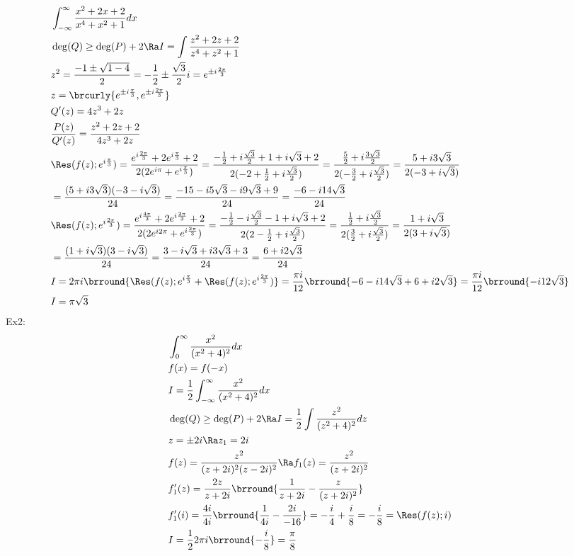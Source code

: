 \begin{align*}
    &\int_{-\infty}^\infty\frac{x^2+2x+2}{x^4+x^2+1}dx\\
    &\deg(Q)\geq\deg(P)+2\Ra I=\int\frac{z^2+2z+2}{z^4+z^2+1}\\
    &z^2=\frac{-1\pm\sqrt{1-4}}{2}=-\frac{1}{2}\pm\frac{\sqrt{3}}{2}i=e^{\pm i\frac{2\pi}{3}}\\
    &z=\brcurly{e^{\pm i\frac{\pi}{3}},e^{\pm i\frac{2\pi}{3}}}\\
    &Q'(z)=4z^3+2z\\
    &\frac{P(z)}{Q'(z)}=\frac{z^2+2z+2}{4z^3+2z}\\
    &\Res(f(z);e^{i\frac{\pi}{3}})=\frac{e^{i\frac{2\pi}{3}}+2e^{i\frac{\pi}{3}}+2}{2(2e^{i\pi}+e^{i\frac{\pi}{3}})}=\frac{-\frac{1}{2}+i\frac{\sqrt{3}}{2}+1+i\sqrt{3}+2}{2(-2+\frac{1}{2}+i\frac{\sqrt{3}}{2})}=\frac{\frac{5}{2}+i\frac{3\sqrt{3}}{2}}{2(-\frac{3}{2}+i\frac{\sqrt{3}}{2})}=\frac{5+i3\sqrt{3}}{2(-3+i\sqrt{3})}\\
    &=\frac{(5+i3\sqrt{3})(-3-i\sqrt{3})}{24}=\frac{-15-i5\sqrt{3}-i9\sqrt{3}+9}{24}=\frac{-6-i14\sqrt{3}}{24}\\
    &\Res(f(z);e^{i\frac{2\pi}{3}})=\frac{e^{i\frac{4\pi}{3}}+2e^{i\frac{2\pi}{3}}+2}{2(2e^{i2\pi}+e^{i\frac{2\pi}{3}})}=\frac{-\frac{1}{2}-i\frac{\sqrt{3}}{2}-1+i\sqrt{3}+2}{2(2-\frac{1}{2}+i\frac{\sqrt{3}}{2})}=\frac{\frac{1}{2}+i\frac{\sqrt{3}}{2}}{2(\frac{3}{2}+i\frac{\sqrt{3}}{2})}=\frac{1+i\sqrt{3}}{2(3+i\sqrt{3})}\\
    &=\frac{(1+i\sqrt{3})(3-i\sqrt{3})}{24}=\frac{3-i\sqrt{3}+i3\sqrt{3}+3}{24}=\frac{6+i2\sqrt{3}}{24}\\
    &I=2\pi i\brround{\Res(f(z);e^{i\frac{\pi}{3}}+\Res(f(z);e^{i\frac{2\pi}{3}})}=\frac{\pi i}{12}\brround{-6-i14\sqrt{3}+6+i2\sqrt{3}}=\frac{\pi i}{12}\brround{-i12\sqrt{3}}\\
    &I=\pi\sqrt{3}
\end{align*}
Ex2:
\begin{align*}
    &\int_0^\infty\frac{x^2}{(x^2+4)^2}dx\\
    &f(x)=f(-x)\\
    &I=\frac{1}{2}\int_{-\infty}^\infty\frac{x^2}{(x^2+4)^2}dx\\
    &\deg(Q)\geq\deg(P)+2\Ra I=\frac{1}{2}\int\frac{z^2}{(z^2+4)^2}dz\\
    &z=\pm 2i\Ra z_1=2i\\
    &f(z)=\frac{z^2}{(z+2i)^2(z-2i)^2}\Ra f_1(z)=\frac{z^2}{(z+2i)^2}\\
    &f_1'(z)=\frac{2z}{z+2i}\brround{\frac{1}{z+2i}-\frac{z}{(z+2i)^2}}\\
    &f_1'(i)=\frac{4i}{4i}\brround{\frac{1}{4i}-\frac{2i}{-16}}=-\frac{i}{4}+\frac{i}{8}=-\frac{i}{8}=\Res(f(z);i)\\
    &I=\frac{1}{2}2\pi i\brround{-\frac{i}{8}}=\frac{\pi}{8}
\end{align*}
